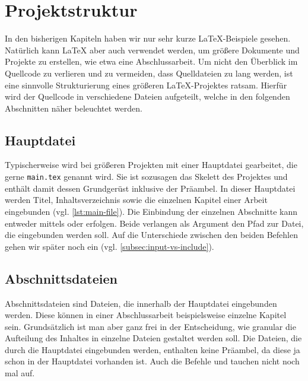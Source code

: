 \section{Projektstruktur}
\label{sec:project-structure}

In den bisherigen Kapiteln haben wir nur sehr kurze \LaTeX{}-Beispiele gesehen. Natürlich kann \LaTeX{} aber auch verwendet werden, um größere Dokumente und Projekte zu erstellen, wie etwa eine Abschlussarbeit. 
Um nicht den Überblick im Quellcode zu verlieren und zu vermeiden, dass Quelldateien zu lang werden, ist eine sinnvolle Strukturierung eines größeren \LaTeX{}-Projektes ratsam. Hierfür wird der Quellcode in verschiedene Dateien aufgeteilt, welche in den folgenden Abschnitten näher beleuchtet werden.

\subsection{Hauptdatei} Typischerweise wird bei größeren Projekten mit einer Hauptdatei gearbeitet, die gerne \texttt{main.tex} genannt wird. Sie ist sozusagen das Skelett des Projektes und enthält damit dessen Grundgerüst inklusive der Präambel. In dieser Hauptdatei werden Titel, Inhaltsverzeichnis sowie die einzelnen Kapitel einer Arbeit eingebunden (vgl. \cref{lst:main-file}). Die Einbindung der einzelnen Abschnitte kann entweder mittels \texttt{} oder \texttt{} erfolgen. Beide verlangen als Argument den Pfad zur Datei, die eingebunden werden soll. Auf die Unterschiede zwischen den beiden Befehlen gehen wir später noch ein (vgl. \cref{subsec:input-vs-include}).
  
 
\subsection{Abschnittsdateien}
 Abschnittsdateien sind Dateien, die innerhalb der Hauptdatei eingebunden werden. Diese können in einer Abschlussarbeit beispielsweise einzelne Kapitel sein. Grundsätzlich ist man aber ganz frei in der Entscheidung, wie granular die Aufteilung des Inhaltes in einzelne Dateien gestaltet werden soll.
 Die Dateien, die durch die Hauptdatei eingebunden werden, enthalten keine Präambel, da diese ja schon in der Hauptdatei vorhanden ist. Auch die Befehle \texttt{} und \texttt{} tauchen nicht noch mal auf.
 
